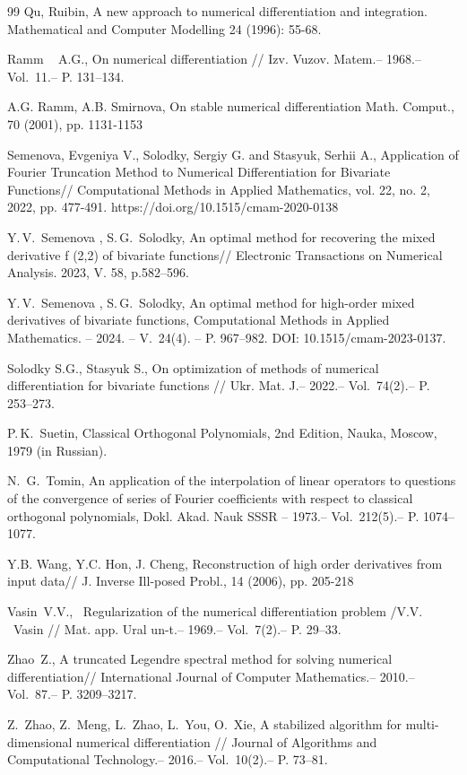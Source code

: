 \documentclass[10pt]{extarticle}
\begin{document}
\begin{thebibliography}{99}
 Qu, Ruibin,
A new approach to numerical differentiation and integration. Mathematical and Computer Modelling 24 (1996): 55-68.

Ramm ~ A.G.,
On numerical differentiation
// Izv. Vuzov. Matem.-- 1968.-- Vol.~11.-- P. 131--134.

A.G. Ramm, A.B. Smirnova,
On stable numerical differentiation Math. Comput., 70 (2001), pp. 1131-1153

Semenova, Evgeniya V., Solodky, Sergiy G. and Stasyuk, Serhii A., Application of Fourier Truncation Method to Numerical
Differentiation for Bivariate Functions// Computational Methods in Applied Mathematics, vol. 22, no. 2, 2022, pp.
477-491. https://doi.org/10.1515/cmam-2020-0138

Y.\,V.~Semenova , S.\,G.~Solodky, An optimal method for recovering the mixed derivative f (2,2)  of bivariate functions// Electronic Transactions on Numerical Analysis. 2023, V. 58, p.582--596.

Y.\,V.~Semenova , S.\,G.~Solodky,
An optimal method for high-order mixed derivatives of bivariate functions,
Computational Methods in Applied Mathematics. -- 2024. -- V.~24(4). -- P. 967--982.
DOI: 10.1515/cmam-2023-0137.

Solodky S.G., Stasyuk S.,
On optimization of methods of numerical differentiation for bivariate functions
// Ukr. Mat. J.-- 2022.-- Vol.~74(2).-- P. 253--273.

P.\,K.~Suetin,
Classical Orthogonal Polynomials, 2nd Edition, Nauka, Moscow, 1979 (in Russian).

N.\ G.~Tomin,
An application of the interpolation of linear operators to questions of the convergence of series
of Fourier coefficients with respect to classical orthogonal polynomials,
Dokl. Akad. Nauk SSSR -- 1973.-- Vol.~212(5).-- P. 1074--1077.

Y.B. Wang, Y.C. Hon, J. Cheng,
Reconstruction of high order derivatives from input data//
J. Inverse Ill-posed Probl., 14 (2006), pp. 205-218

Vasin~V.V., \
Regularization of the numerical differentiation problem
/V.V. ~Vasin
// Mat. app. Ural un-t.-- 1969.-- Vol.~7(2).-- P. 29--33.

Zhao~Z., A truncated Legendre spectral method for solving numerical differentiation//
International Journal of Computer Mathematics.-- 2010.-- Vol.~87.-- P. 3209--3217.

Z.~Zhao, Z.~Meng, L.~Zhao, L.~You, O.~Xie,
A stabilized algorithm for multi-dimensional numerical differentiation
// Journal of Algorithms and Computational Technology.-- 2016.-- Vol.~10(2).-- P. 73--81.

\end{thebibliography}
\end{document}
